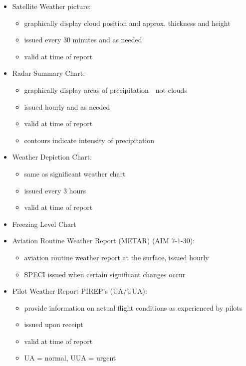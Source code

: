 \documentclass[twoside,openright]{report}
\begin{document}
\begin{itemize}
  \item Satellite Weather picture:
    \begin{itemize}
      \item graphically display cloud position and approx. thickness and height
      \item issued every 30 minutes and as needed
      \item valid at time of report
    \end{itemize}
  \item Radar Summary Chart:
    \begin{itemize}
      \item graphically display areas of precipitation—not clouds
      \item issued hourly and as needed
      \item valid at time of report
      \item contours indicate intensity of precipitation
    \end{itemize}
  \item Weather Depiction Chart:
    \begin{itemize}
      \item same as significant weather chart
      \item issued every 3 hours
      \item valid at time of report
    \end{itemize}
  \item Freezing Level Chart
  \item Aviation Routine Weather Report (METAR) (AIM 7-1-30):
    \begin{itemize}
      \item aviation routine weather report at the surface, issued hourly
      \item SPECI issued when certain significant changes occur
    \end{itemize}
  \item Pilot Weather Report PIREP's (UA/UUA):
    \begin{itemize}
      \item provide information on actual flight conditions as experienced by
        pilots
      \item issued upon receipt
      \item valid at time of report
      \item UA = normal, UUA = urgent
    \end{itemize}
\end{itemize}
\end{document}
